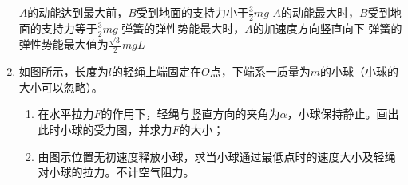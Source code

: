 \begin{enumerate}[leftmargin=0em]
\fourchoices
{$ A $的动能达到最大前，$ B $受到地面的支持力小于$ \frac{ 3 }{ 2 } mg $}
{$ A $的动能最大时，$ B $受到地面的支持力等于$ \frac{ 3 }{ 2 } mg $}
{弹簧的弹性势能最大时，$ A $的加速度方向竖直向下}
{弹簧的弹性势能最大值为$ \frac{\sqrt{3}}{2}mgL $}




\item 
{}
如图所示，长度为$ l $的轻绳上端固定在$ O $点，下端系一质量为$ m $的小球（小球的大小可以忽略）。
\begin{enumerate}
\renewcommand{\labelenumi}{\arabic{enumi}.}
\item
在水平拉力$ F $的作用下，轻绳与竖直方向的夹角为$ \alpha $，小球保持静止。画出此时小球的受力图，并求力$ F $的大小； 
\item 
由图示位置无初速度释放小球，求当小球通过最低点时的速度大小及轻绳对小球的拉力。不计空气阻力。



\end{enumerate}
\begin{figure}[h!]
\flushright

\end{figure}







\end{enumerate}
